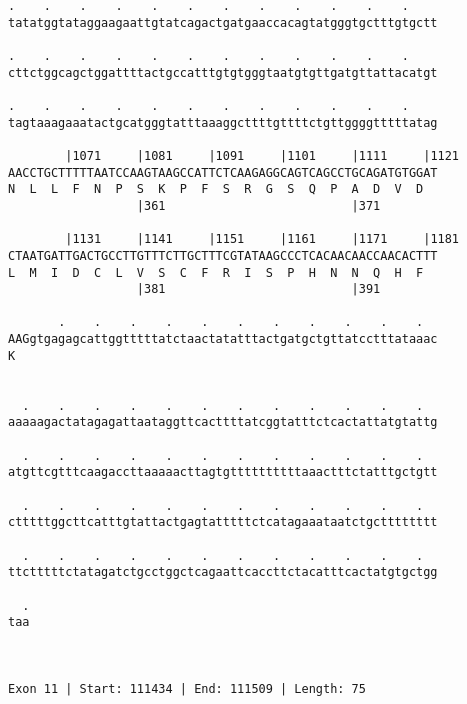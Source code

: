 \documentclass{article}
\begin{document}
\begin{Verbatim}
.    .    .    .    .    .    .    .    .    .    .    .    
tatatggtataggaagaattgtatcagactgatgaaccacagtatgggtgctttgtgctt
                                                            
.    .    .    .    .    .    .    .    .    .    .    .    
cttctggcagctggattttactgccatttgtgtgggtaatgtgttgatgttattacatgt
                                                            
.    .    .    .    .    .    .    .    .    .    .    .    
tagtaaagaaatactgcatgggtatttaaaggcttttgttttctgttggggtttttatag
                                                            
        |1071     |1081     |1091     |1101     |1111     |1121
AACCTGCTTTTTAATCCAAGTAAGCCATTCTCAAGAGGCAGTCAGCCTGCAGATGTGGAT
N  L  L  F  N  P  S  K  P  F  S  R  G  S  Q  P  A  D  V  D  
                  |361                          |371        
  
        |1131     |1141     |1151     |1161     |1171     |1181
CTAATGATTGACTGCCTTGTTTCTTGCTTTCGTATAAGCCCTCACAACAACCAACACTTT
L  M  I  D  C  L  V  S  C  F  R  I  S  P  H  N  N  Q  H  F  
                  |381                          |391        
  
       .    .    .    .    .    .    .    .    .    .    .  
AAGgtgagagcattggtttttatctaactatatttactgatgctgttatcctttataaac
K                                                           
                                                            
  
  .    .    .    .    .    .    .    .    .    .    .    .  
aaaaagactatagagattaataggttcacttttatcggtatttctcactattatgtattg
                                                            
  .    .    .    .    .    .    .    .    .    .    .    .  
atgttcgtttcaagaccttaaaaacttagtgttttttttttaaactttctatttgctgtt
                                                            
  .    .    .    .    .    .    .    .    .    .    .    .  
ctttttggcttcatttgtattactgagtatttttctcatagaaataatctgctttttttt
                                                            
  .    .    .    .    .    .    .    .    .    .    .    .  
ttctttttctatagatctgcctggctcagaattcaccttctacatttcactatgtgctgg
                                                            
  .
taa
   
   
 
Exon 11 | Start: 111434 | End: 111509 | Length: 75




\end{Verbatim}
\end{document}
